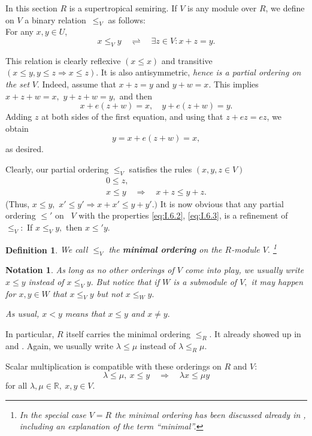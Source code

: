 \documentclass [12pt,a4paper,reqno]{amsart}
\newtheorem{defn}[thm]{Definition}
\newtheorem{notation}[thm]{Notation}
\begin{document}
In this section $R$ is a supertropical semiring.  If $V$ is any module over $R$, we define on $V$ a binary relation~$\le_V$ as follows: \\ For any $x,y\in U$,
 \begin{equation}\label{eq:I.6.1}
x\le_Vy {\quad {\rightleftharpoons} \quad }\exists z\in V: x+z=y.
\end{equation}

This relation is clearly reflexive $(x\le x)$ and transitive $(x\le y, y\le z\Rightarrow x\le z).$ It is also antisymmetric, \textit{hence is a partial ordering on the set} $V.$ Indeed, assume that $x + z=y$ and $y+w=x.$ This implies $x+z+w=x,$ $y+z+w=y,$ and then
$$x+e(z+w)=x,\quad y+e(z+w)=y.$$
Adding $z$ at both sides of the first equation, and using that $z+ez=ez$, we obtain
$$y=x+e(z+w)=x,$$
as desired.

Clearly, our partial ordering $\le_V$ satisfies  the rules $(x,y,z\in V)$
 \begin{gather}
 0\le z,\label{eq:I.6.2}\\
 x\le y {\quad {\Rightarrow} \quad } x+z\le y+z.\label{eq:I.6.3}
 \end{gather}
 (Thus, $x\le y,$ $x'\le y'\Rightarrow x+x'\le y+y'.)$
 It is now obvious that any partial ordering $\le'$ on~ $V$ with the properties \eqref{eq:I.6.2}, \eqref{eq:I.6.3}, is a refinement of $\le_V:$ If $x\le_Vy,$ then $x\le' y.$

\begin{defn}\label{defn:I.6.1}
We call $\le_V$ the {\textbf{{minimal ordering}}} on the $R$-module $V.$ \footnote{In the special case $V= R$ the minimal ordering has been discussed already in {\cite[~\S{{5}}]{QF1}}, including an explanation of the term ``minimal''.}
\end{defn}
\begin{notation} \label{notat:I.6.2}
As long as no other orderings of $V$ come into play, we usually write $x\le y$ instead of $x\le_V y.$ But notice that  if $W$ is a submodule of $V,$ it may happen for $x,y\in W$ that $x\le_V y$ but not $x\le_Wy.$

As usual, $x<y$ means that $x\le y$ and $x\ne y.$\end{notation}

In particular, $R$ itself carries the minimal ordering $\le_R.$ It already showed up in \cite[Proposition 11.8]{IKR1} and {\cite[~\S{{5}}]{QF1}}. Again, we usually write ${\lambda} \le \mu$ instead of ${\lambda} \le_R\mu.$

Scalar multiplication is compatible with these orderings on $R$ and $V:$
\begin{equation}\label{eq:I.6.4}
{\lambda} \le\mu,\ x\le y{\quad {\Rightarrow} \quad } {\lambda}  x\le \mu y
\end{equation}
for all ${\lambda} ,\mu\in {\mathbb R},\ x,y\in V.$
\end{document}
